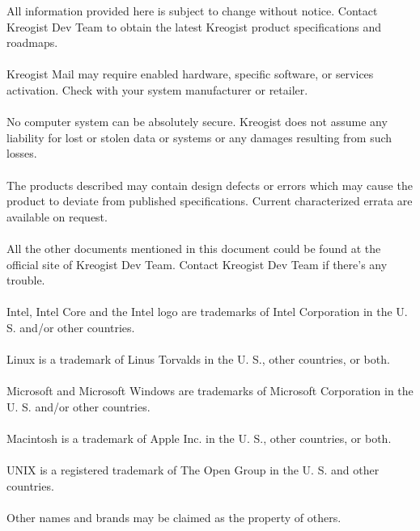 \documentclass[11pt,a4paper]{article}
\newcommand{\noticesize}{\fontsize{10pt}{\baselineskip}\selectfont}
\begin{document}
    {
    \noticesize
    \begin{spacing}{0.5}
        \noindent All information provided here is subject to change without notice. Contact Kreogist Dev Team to obtain the latest Kreogist product specifications and roadmaps.\\ \\
        \noindent Kreogist Mail may require enabled hardware, specific software, or services activation. Check with your system manufacturer or retailer.\\ \\
        \noindent No computer system can be absolutely secure. Kreogist does not assume any liability for lost or stolen data or systems or any damages resulting from such losses.\\ \\
        \noindent The products described may contain design defects or errors which may cause the product to deviate from published specifications. Current characterized errata are available on request.\\ \\
        \noindent All the other documents mentioned in this document could be found at the official site of Kreogist Dev Team. Contact Kreogist Dev Team if there's any trouble.\\ \\
        \noindent Intel, Intel Core and the Intel logo are trademarks of Intel Corporation in the U. S. and/or other countries.\\ \\
        \noindent Linux is a trademark of Linus Torvalds in the U. S., other countries, or both.\\ \\
        \noindent Microsoft and Microsoft Windows are trademarks of Microsoft Corporation in the U. S. and/or other countries.\\ \\
        \noindent Macintosh is a trademark of Apple Inc. in the U. S., other countries, or both.\\ \\
        \noindent UNIX is a registered trademark of The Open Group in the U. S. and other countries.\\ \\
        \noindent *Other names and brands may be claimed as the property of others.\\ \\
    \end{spacing}
}
\end{document}
